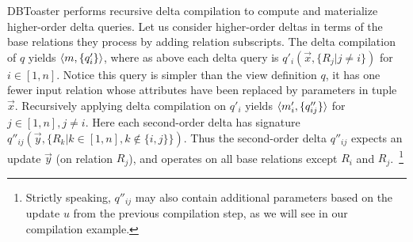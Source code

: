 DBToaster performs recursive delta compilation to compute and materialize
higher-order delta queries. Let us consider higher-order deltas in
terms of the base relations they process by adding relation subscripts. The
delta compilation of $q$ yields ${\langle m,\{q'_i\}\rangle}$, where as above each delta
query is $q'_i(\vec{x}, \{R_j | j \neq i\})$ for $i \in [1,n]$. Notice this
query is simpler than the view definition $q$, it has one fewer input relation
whose attributes have been replaced by parameters in tuple $\vec{x}$.
Recursively applying delta compilation on $q'_i$ yields
${\langle m'_i, \{q''_{ij}\}\rangle}$ for $j \in [1,n], j \neq i$. Here each second-order
delta has signature $q''_{ij}(\vec{y},\{R_k | k \in [1,n], k \notin \{i,j\}\})$.
Thus the second-order delta $q''_{ij}$ expects an update $\vec{y}$ (on relation
$R_j$), and operates on all base relations except $R_i$ and
$R_j$.~\footnote{Strictly speaking, $q''_{ij}$ may also contain additional
parameters based on the update $u$ from the previous compilation step, as we
will see in our compilation example.}

